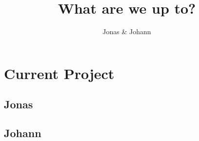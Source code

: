 \documentclass{article}
\title{What are we up to?}
\author{Jonas \& Johann}
\begin{document}
\maketitle

\section{Current Project}

\subsection{Jonas}


\subsection{Johann}
\end{document}
